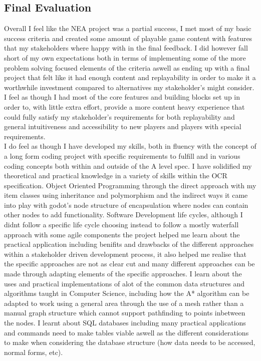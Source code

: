 \documentclass{article}
\begin{document}
        \subsection{Final Evaluation}
        Overall I feel like the NEA project was a partial success, I met most of my basic success criteria and created some amount of playable game content with features that my stakeholders where happy with in the final feedback. I did however fall short of my own expectations both in terms of implementing some of the more problem solving focused elements of the criteria aswell as ending up with a final project that felt like it had enough content and replayability in order to make it a worthwhile investment compared to alternatives my stakeholder's might consider. I feel as though I had most of the core features and building blocks set up in order to, with little extra effort, provide a more content heavy experience that could fully satisfy my stakeholder's requirements for both replayability and general intuitiveness and accessibility to new players and players with special requirements.\\
        I do feel as though I have developed my skills, both in fluency with the concept of a long form coding project with specific requirements to fulfill and in various coding concepts both within and outside of the A level spec. I have solidified my theoretical and practical knowledge in a variety of skills within the OCR specification. Object Oriented Programming through the direct approach with my item classes using inheritance and polymorphism and the indirect ways it came into play with godot's node structure of encapsulation where nodes can contain other nodes to add functionality. Software Development life cycles, although I didnt follow a specific life cycle choosing instead to follow a mostly waterfall approach with some agile components the project helped me learn about the practical application including benifits and drawbacks of the different approaches within a stakeholder driven development process, it also helped me realise that the specific approaches are not as clear cut and many different approaches can be made through adapting elements of the specific approaches. I learn about the uses and practical implementations of alot of the common data structures and algorithms taught in Computer Science, including how the A* algorithm can be adapted to work using a general area through the use of a mesh rather than a manual graph structure which cannot support pathfinding to points inbetween the nodes. I learnt about SQL databases including many practical applications and commands need to make tables viable aswell as the different considerations to make when considering the database structure (how data needs to be accessed, normal forms, etc).\\
\end{document}
